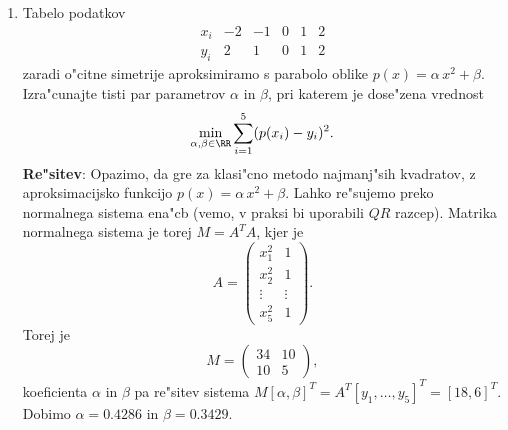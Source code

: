 \begin{enumerate}
  \item Tabelo podatkov
   $$\begin{array}{c|rrrrr}
     x_i & -2 & -1 & 0 & 1 & 2\\ \hline
     y_i &  2 &  1 & 0 & 1 & 2
     \end{array}
   $$
   zaradi o"citne simetrije aproksimiramo s parabolo oblike
    $p(x)=\alpha\,x^2+\beta$. 
    Izra"cunajte tisti par parametrov $\alpha$ in
    $\beta$, pri katerem je dose"zena vrednost
    $$\min_{\alpha,\beta\in\RR}\sum_{i=1}^5(p(x_i)-y_i)^2.$$
    {\bf Re"sitev}: Opazimo, da gre za klasi"cno metodo najmanj"sih 
    kvadratov, z aproksimacijsko funkcijo $p(x)=\alpha\,x^2+\beta$.
    Lahko re"sujemo preko normalnega sistema ena"cb (vemo, v praksi bi
    uporabili $QR$ razcep). Matrika normalnega sistema je torej
    $M=A^TA$, kjer je 
    $$A=\left(
             \begin{array}{cc}
               x_1^2 & 1\\
               x_2^2 & 1 \\
               \vdots & \vdots \\
               x_5^2 & 1
             \end{array}
      \right).
      $$
      Torej je 
      $$M=\left(
                   \begin{array}{cc}
                     34 & 10\\
                     10 & 5
                   \end{array}
      \right),
      $$
      koeficienta $\alpha$ in $\beta$ pa re"sitev sistema
      $M[\alpha,\beta]^T=A^T[y_1,\dots,y_5]^T=[18,6]^T$.
      Dobimo $\alpha=0.4286$ in $\beta=0.3429$.
      

\end{enumerate}
